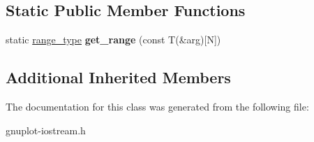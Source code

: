 \subsection*{Static Public Member Functions}
\begin{DoxyCompactItemize}
\item 
\mbox{\label{classgnuplotio_1_1ArrayTraits_3_01T[N]_4_adc9c1ce6da4923418f367e08c150a928}} 
static \hyperlink{classgnuplotio_1_1IteratorRange}{range\+\_\+type} {\bfseries get\+\_\+range} (const T(\&arg)\mbox{[}N\mbox{]})
\end{DoxyCompactItemize}
\subsection*{Additional Inherited Members}


The documentation for this class was generated from the following file\+:\begin{DoxyCompactItemize}
\item 
gnuplot-\/iostream.\+h\end{DoxyCompactItemize}
